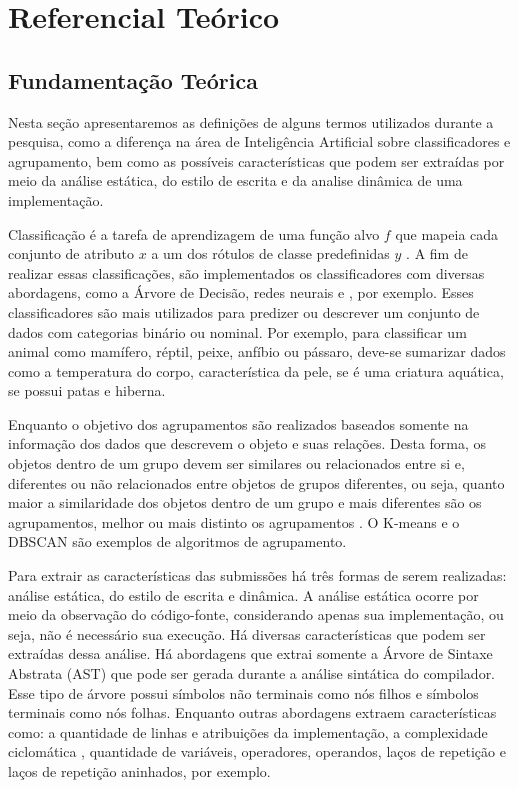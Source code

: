 \chapter{Referencial Teórico}
\label{chapterRef}

	\section{Fundamentação Teórica}
	\label{sectionFund}
		Nesta seção apresentaremos as definições de alguns termos utilizados
		durante a pesquisa, como a diferença na área de Inteligência Artificial
		sobre classificadores e agrupamento, bem como as possíveis características
		que podem ser extraídas por meio da análise estática, do estilo de escrita
		e da analise dinâmica de uma implementação.
		
		Classificação é a tarefa de aprendizagem de uma função alvo $f$ que mapeia cada
		conjunto de atributo $x$ a um dos rótulos de classe predefinidas $y$ \cite{Tan:2005:ch4}. A
		fim de realizar essas classificações, são implementados os classificadores com
		diversas abordagens, como a Árvore de Decisão, redes neurais e , por exemplo. Esses classificadores são mais utilizados para
		predizer ou descrever um conjunto de dados com categorias binário ou nominal.
		Por exemplo, para classificar um animal como mamífero, réptil, peixe, anfíbio
		ou pássaro, deve-se sumarizar dados como a temperatura do corpo, característica
		da pele, se é uma criatura aquática, se possui patas e hiberna.
		
		Enquanto o objetivo dos agrupamentos são realizados baseados somente na informação
		dos dados que descrevem o objeto e suas relações. Desta forma, os objetos dentro
		de um grupo devem ser similares ou relacionados entre si e, diferentes ou não
		relacionados entre objetos de grupos diferentes, ou seja, quanto maior a similaridade
		dos objetos dentro de um grupo e mais diferentes são os agrupamentos, melhor ou mais
		distinto os agrupamentos \cite{Tan:2005:ch8}. O K-means e o DBSCAN são exemplos de algoritmos de
		agrupamento.
		
		Para extrair as características das submissões há três formas de serem realizadas:
		análise estática, do estilo de escrita e dinâmica. A análise estática ocorre por meio
		da observação do código-fonte, considerando apenas sua implementação, ou seja, não
		é necessário sua execução. Há diversas características que podem ser extraídas dessa
		análise. Há abordagens que extrai somente a Árvore de Sintaxe Abstrata (AST) que pode
		ser gerada durante a análise sintática do compilador. Esse tipo de árvore possui símbolos
		não terminais como nós filhos e símbolos terminais como nós folhas. Enquanto outras
		abordagens extraem características como: a quantidade de linhas e atribuições da
		implementação, a complexidade ciclomática \cite{mccabe}, quantidade de variáveis, 
		operadores, operandos, laços de repetição e laços de repetição aninhados, por exemplo.
		
